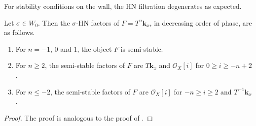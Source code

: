 \documentclass{amsart}
\begin{document}
For stability conditions on the wall, the HN filtration degenerates as expected.
\begin{proposition}\label{prop:HN0}
  Let \(\sigma \in W_{0}\).
  Then the \(\sigma\)-HN factors of \(F = T^n \mathbf{k}_x\), in decreasing order of phase, are as follows.
  \begin{enumerate}
  \item For \(n = -1\), \(0\) and \(1\), the object \(F\) is semi-stable.
  \item For \(n \geq 2\), the semi-stable factors of \(F\) are \(T\mathbf{k}_x\) and \(\mathcal{O}_X[i]\) for \(0 \geq i \geq -n+2\).
  \item For \(n \leq -2\), the semi-stable factors of \(F\) are \(\mathcal{O}_X[i]\) for \(-n \geq i \geq 2\) and \(T^{-1}\mathbf{k}_x\).
  \end{enumerate}
\end{proposition}
\begin{proof}
  The proof is analogous to the proof of .
\end{proof}
\end{document}
